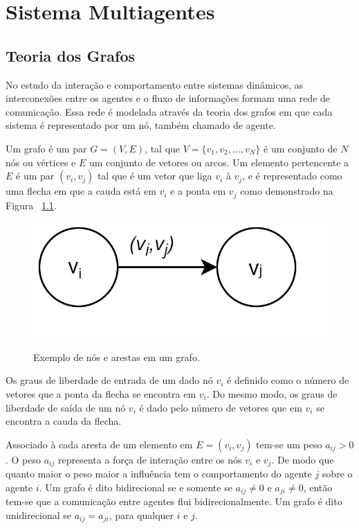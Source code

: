 \chapter{Sistema Multiagentes}
\label{chap:multiagentes}

\section{Teoria dos Grafos}
No estudo da interação e comportamento entre sistemas dinâmicos, as interconexões entre os agentes e o fluxo de informações formam uma rede de comunicação. Essa rede é modelada através da teoria dos grafos em que cada sistema é representado por um nó, também chamado de agente.

Um grafo é um par $G = (V, E)$, tal que $V = \{v_{1},v_{2}, ...,v_{N}\}$ é um conjunto de $N$ nós ou vértices e $E$ um conjunto de vetores ou arcos. Um elemento pertencente a $E$ é um par $(v_{i}, v_{j})$ tal que é um vetor que liga $v_{i}$ à $v_{j}$, e é representado como uma flecha em que a cauda está em $v_{i}$ e a ponta em $v_{j}$ como demonstrado na Figura ~\ref{fig:nos_arestas_grafos}. 

\begin{figure}[hb]
    \centering
    \caption{Exemplo de nós e arestas em um grafo.}
    \includegraphics[scale=0.3]{figures/Multiagente/ex_grafo2.png}
    \label{fig:nos_arestas_grafos}
\end{figure}

Os graus de liberdade de entrada de um dado nó $v_i$ é definido como o número de vetores que a ponta da flecha se encontra em $v_i$. Do mesmo modo, os graus de liberdade de saída de um nó $v_i$ é dado pelo número de vetores que em $v_i$ se encontra a cauda da flecha.

Associado à cada aresta de um elemento em $E = (v_i, v_j)$ tem-se um peso $a_{ij} > 0$. O peso $a_{ij}$ representa a força de interação entre os nós $v_i$ e $v_j$. De modo que quanto maior o peso maior a influência tem o comportamento do agente $j$ sobre o agente $i$.
Um grafo é dito bidirecional se e somente se $a_{ij} \neq 0$ e $a_{ji} \neq 0$, então tem-se que a comunicação entre agentes flui bidirecionalmente. Um grafo é dito unidirecional se $a_{ij} = a_{ji}$, para qualquer $i$ e $j$.


